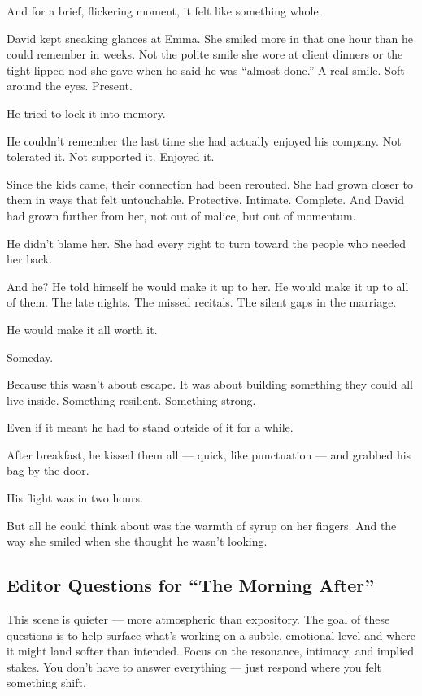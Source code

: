 And for a brief, flickering moment, it felt like something whole.

David kept sneaking glances at Emma. She smiled more in that one hour than he could remember in weeks. Not the 
polite smile she wore at client dinners or the tight-lipped nod she gave when he said he was ``almost done.''
A real smile. Soft around the eyes. Present.

He tried to lock it into memory.

He couldn’t remember the last time she had actually enjoyed his company. Not tolerated it. Not supported it. 
Enjoyed it.

Since the kids came, their connection had been rerouted. She had grown closer to them in ways that felt 
untouchable. Protective. Intimate. Complete. And David had grown further from her, not out of malice, 
but out of momentum.

He didn’t blame her. She had every right to turn toward the people who needed her back.

And he? He told himself he would make it up to her. He would make it up to all of them.
The late nights. The missed recitals. The silent gaps in the marriage.

He would make it all worth it.

Someday.

Because this wasn’t about escape. It was about building something they could all live inside.
Something resilient. Something strong.

Even if it meant he had to stand outside of it for a while.

After breakfast, he kissed them all --- quick, like punctuation --- and grabbed his bag by the door.

His flight was in two hours.

But all he could think about was the warmth of syrup on her fingers.
And the way she smiled when she thought he wasn’t looking.


\subsection*{Editor Questions for ``The Morning After''}

This scene is quieter — more atmospheric than expository. The goal of these questions is to help surface what’s working on a subtle, emotional level and where it might land softer than intended. Focus on the resonance, intimacy, and implied stakes. You don’t have to answer everything — just respond where you felt something shift.

